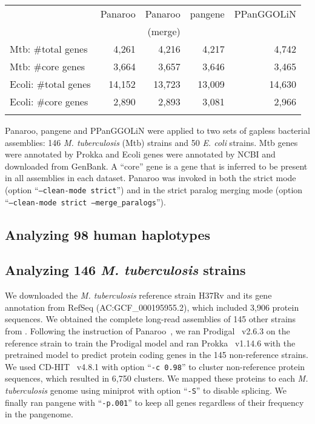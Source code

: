 \documentclass{bioinfo}
\begin{document}
\begin{table}[!tb]
{\footnotesize\label{tab:bac}
\begin{tabular}{p{2.3cm}rrrr}
\toprule
& Panaroo & Panaroo & pangene & PPanGGOLiN\\
&         & (merge) \\
\midrule
Mtb: \#total genes   & 4,261  & 4,216  & 4,217  & 4,742  \\
Mtb: \#core genes    & 3,664  & 3,657  & 3,646  & 3,465  \\
Ecoli: \#total genes & 14,152 & 13,723 & 13,009 & 14,630 \\
Ecoli: \#core genes  & 2,890  & 2,893  & 3,081  & 2,966  \\
\botrule
\end{tabular}
}{Panaroo, pangene and PPanGGOLiN were applied to two sets of gapless bacterial assemblies:
146 \emph{M. tuberculosis} (Mtb) strains and 50 \emph{E. coli} strains.
Mtb genes were annotated by Prokka and Ecoli genes were annotated by NCBI and downloaded from GenBank.
A ``core'' gene is a gene that is inferred to be present in all assemblies in each dataset.
Panaroo was invoked in both the strict mode (option ``{\tt --clean-mode strict}'')
and in the strict paralog merging mode (option ``{\tt --clean-mode strict --merge\_paralogs}'').}
\end{table}

\subsection*{Analyzing 98 human haplotypes}

\subsection*{Analyzing 146 \emph{M. tuberculosis} strains}

We downloaded the \emph{M. tuberculosis} reference strain H37Rv and its gene annotation from RefSeq (AC:GCF\_000195955.2),
which included 3,906 protein sequences.
We obtained the complete long-read assemblies of 145 other strains from \citet{Marin:2022aa}.
Following the instruction of Panaroo~\citep{Tonkin-Hill:2020aa},
we ran Prodigal~\citep{Hyatt:2010aa} v2.6.3 on the reference strain to train the Prodigal model
and ran Prokka~\citep{Seemann:2014aa} v1.14.6 with the pretrained model to predict protein coding genes
in the 145 non-reference strains.
We used CD-HIT~\citep{Li:2006aa,Fu:2012aa} v4.8.1 with option ``{\tt -c 0.98}'' to cluster non-reference protein sequences,
which resulted in 6,750 clusters.
We mapped these proteins to each \emph{M. tuberculosis} genome using miniprot with option ``{\tt -S}'' to disable splicing.
We finally ran pangene with ``{\tt -p.001}''
to keep all genes regardless of their frequency in the pangenome.
\end{document}
